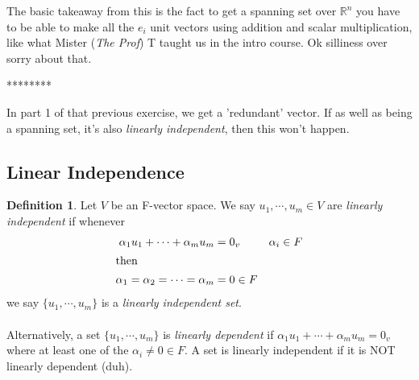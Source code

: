 \documentclass{report}
\theoremstyle{remark}
\theoremstyle{definition}
\newtheorem{definition}[theorem]{Definition}
\theoremstyle{definition}
\theoremstyle{theorem}
\begin{document}
The basic takeaway from this is the fact to get a spanning set over $\mathbb{R}^n$ you have to be able to make all the $e_i$ unit vectors using addition and scalar multiplication, like what Mister (\textit{The Prof}) T taught us in the intro course. Ok silliness over sorry about that.\\
\begin{center}
    ********
\end{center}
In part 1 of that previous exercise, we get a 'redundant' vector. If as well as being a spanning set, it's also \emph{linearly independent}, then this won't happen.
\subsection{Linear Independence}
\begin{definition}
Let $V$ be an F-vector space. We say $u_1, \cdots, u_m \in V$ are \emph{linearly independent} if whenever
\begin{align*}
    \alpha_1u_1 + \cdots + \alpha_mu_m &= 0_v & \alpha_i \in F\\
    \intertext{then}
    \alpha_1 = \alpha_2 = \cdots = \alpha_m &= 0 \in F
\end{align*}
we say $\{u_1, \cdots, u_m \}$ is a \emph{linearly independent set}.\\\\
Alternatively, a set $\{u_1, \cdots, u_m\}$ is \emph{linearly dependent} if $\alpha_1u_1 + \cdots + \alpha_mu_m = 0_v$ where at least one of the $\alpha_i \neq 0 \in F$. A set is linearly independent if it is NOT linearly dependent (duh).
\end{definition}
\end{document}
